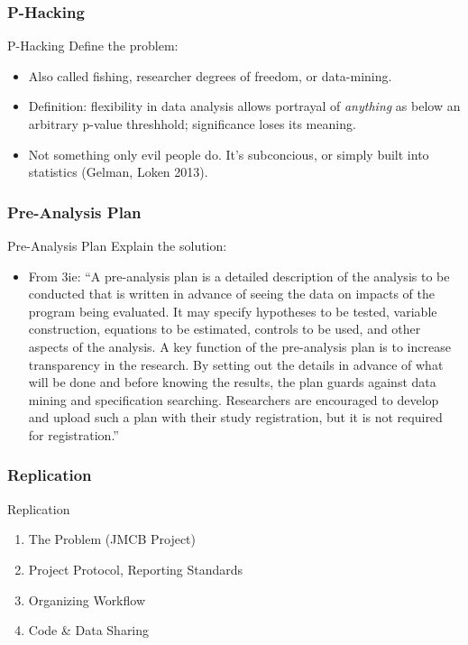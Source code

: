 \documentclass{beamer}
\begin{document}
\subsubsection*{P-Hacking}
\begin{frame}[<.->]{P-Hacking}
Define the problem:
\begin{itemize}
\item
Also called fishing, researcher degrees of freedom, or data-mining.
\item
Definition: flexibility in data analysis allows portrayal of \textit{anything} as below an arbitrary p-value threshhold; significance loses its meaning.
\item
Not something only evil people do. It's subconcious, or simply built into statistics (Gelman, Loken 2013).
\end{itemize}
\end{frame}

\subsubsection*{Pre-Analysis Plan}
\begin{frame}{Pre-Analysis Plan}
Explain the solution:
\begin{itemize}
\item
From 3ie: ``A pre-analysis plan is a detailed description of the analysis to be conducted that is written in advance of seeing the data on impacts of the program being evaluated. It may specify hypotheses to be tested, variable construction, equations to be estimated, controls to be used, and other aspects of the analysis. A key function of the pre-analysis plan is to increase transparency in the research. By setting out the details in advance of what will be done and before knowing the results, the plan guards against data mining and specification searching. Researchers are encouraged to develop and upload such a plan with their study registration, but it is not required for registration.''
\end{itemize}
\end{frame}


\subsubsection*{Replication}
\begin{frame}{Replication}
\begin{enumerate}[<.->]
 \item The Problem	(JMCB Project)
 \item Project Protocol, Reporting Standards
 \item Organizing Workflow
 \item Code \& Data Sharing
\end{enumerate}
\end{frame}
\end{document}

